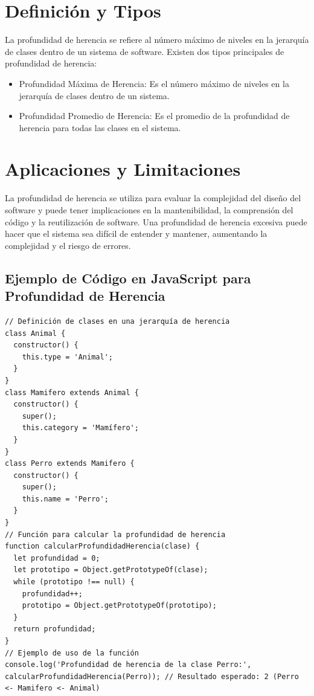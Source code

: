 \documentclass{article}
\begin{document}
\section{Definición y Tipos}

La profundidad de herencia se refiere al número máximo de niveles en la jerarquía de clases dentro de un sistema de software. Existen dos tipos principales de profundidad de herencia:
\begin{itemize}
    \item Profundidad Máxima de Herencia: Es el número máximo de niveles en la jerarquía de clases dentro de un sistema.
    \item Profundidad Promedio de Herencia: Es el promedio de la profundidad de herencia para todas las clases en el sistema.
\end{itemize}

\section{Aplicaciones y Limitaciones}

La profundidad de herencia se utiliza para evaluar la complejidad del diseño del software y puede tener implicaciones en la mantenibilidad, la comprensión del código y la reutilización de software. Una profundidad de herencia excesiva puede hacer que el sistema sea difícil de entender y mantener, aumentando la complejidad y el riesgo de errores.

\subsection{Ejemplo de Código en JavaScript para Profundidad de Herencia}

\begin{lstlisting}
// Definición de clases en una jerarquía de herencia
class Animal {
  constructor() {
    this.type = 'Animal';
  }
}
class Mamifero extends Animal {
  constructor() {
    super();
    this.category = 'Mamífero';
  }
}
class Perro extends Mamifero {
  constructor() {
    super();
    this.name = 'Perro';
  }
}
// Función para calcular la profundidad de herencia
function calcularProfundidadHerencia(clase) {
  let profundidad = 0;
  let prototipo = Object.getPrototypeOf(clase);
  while (prototipo !== null) {
    profundidad++;
    prototipo = Object.getPrototypeOf(prototipo);
  }
  return profundidad;
}
// Ejemplo de uso de la función
console.log('Profundidad de herencia de la clase Perro:', calcularProfundidadHerencia(Perro)); // Resultado esperado: 2 (Perro <- Mamifero <- Animal)
\end{lstlisting}
\end{document}
